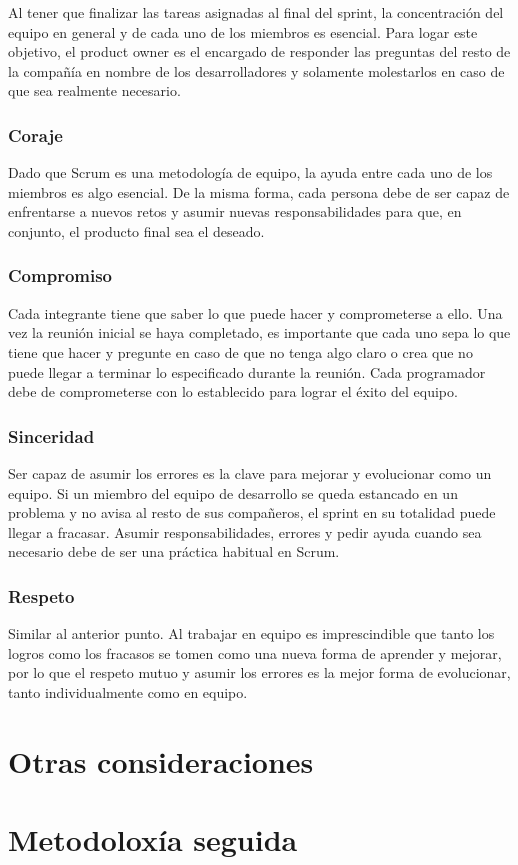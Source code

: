 Al tener que finalizar las tareas asignadas al final del sprint, la concentración del equipo en general y de cada uno de los miembros es esencial. Para logar este objetivo, el product owner es el encargado de responder las preguntas del resto de la compañía en nombre de los desarrolladores y solamente molestarlos en caso de que sea realmente necesario. 

\subsubsection{Coraje}

Dado que Scrum es una metodología de equipo, la ayuda entre cada uno de los miembros es algo esencial. De la misma forma, cada persona debe de ser capaz de enfrentarse a nuevos retos y asumir nuevas responsabilidades para que, en conjunto, el producto final sea el deseado. 

\subsubsection{Compromiso}

Cada integrante tiene que saber lo que puede hacer y comprometerse a ello. Una vez la reunión inicial se haya completado, es importante que cada uno sepa lo que tiene que hacer y pregunte en caso de que no tenga algo claro o crea que no puede llegar a terminar lo especificado durante la reunión. Cada programador debe de comprometerse con lo establecido para lograr el éxito del equipo.

\subsubsection{Sinceridad}

Ser capaz de asumir los errores es la clave para mejorar y evolucionar como un equipo. Si un miembro del equipo de desarrollo se queda estancado en un problema y no avisa al resto de sus compañeros, el sprint en su totalidad puede llegar a fracasar. Asumir responsabilidades, errores y pedir ayuda cuando sea necesario debe de ser una práctica habitual en Scrum.

\subsubsection{Respeto}

Similar al anterior punto. Al trabajar en equipo es imprescindible que tanto los logros como los fracasos se tomen como una nueva forma de aprender y mejorar, por lo que el respeto mutuo y asumir los errores es la mejor forma de evolucionar, tanto individualmente como en equipo.

\section{Otras consideraciones}

\section{Metodoloxía seguida}